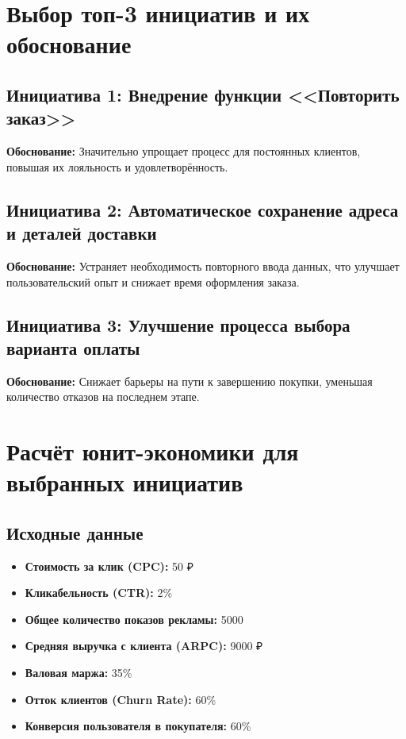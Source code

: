 \documentclass[a4paper,12pt]{article}
\begin{document}
\section{Выбор топ-3 инициатив и их обоснование}

\subsection{Инициатива 1: Внедрение функции <<Повторить заказ>>}

\textbf{Обоснование:} Значительно упрощает процесс для постоянных клиентов, повышая их лояльность и удовлетворённость.

\subsection{Инициатива 2: Автоматическое сохранение адреса и деталей доставки}

\textbf{Обоснование:} Устраняет необходимость повторного ввода данных, что улучшает пользовательский опыт и снижает время оформления заказа.

\subsection{Инициатива 3: Улучшение процесса выбора варианта оплаты}

\textbf{Обоснование:} Снижает барьеры на пути к завершению покупки, уменьшая количество отказов на последнем этапе.

\section{Расчёт юнит-экономики для выбранных инициатив}

\subsection{Исходные данные}

\begin{itemize}
  \item \textbf{Стоимость за клик (CPC):} 50 ₽
  \item \textbf{Кликабельность (CTR):} 2\%
  \item \textbf{Общее количество показов рекламы:} 5000
  \item \textbf{Средняя выручка с клиента (ARPC):} 9000 ₽
  \item \textbf{Валовая маржа:} 35\%
  \item \textbf{Отток клиентов (Churn Rate):} 60\%
  \item \textbf{Конверсия пользователя в покупателя:} 60\%
\end{itemize}
\end{document}
